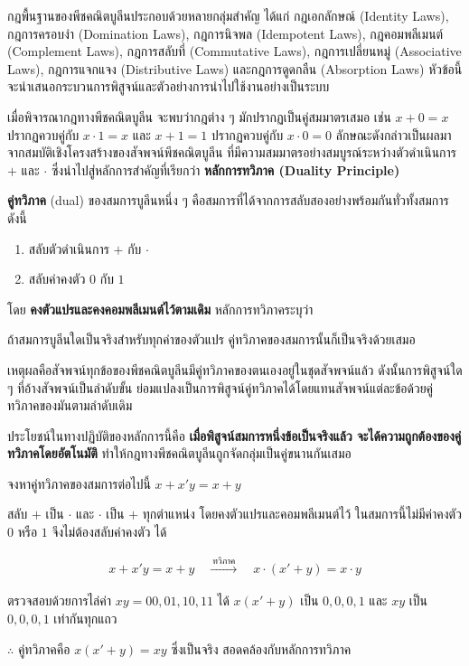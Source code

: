 กฎพื้นฐานของพีชคณิตบูลีนประกอบด้วยหลายกลุ่มสำคัญ ได้แก่ กฎเอกลักษณ์ (Identity Laws), กฎการครอบงำ (Domination Laws), กฎการนิจพล (Idempotent Laws), กฎคอมพลีเมนต์ (Complement Laws), กฎการสลับที่ (Commutative Laws), กฎการเปลี่ยนหมู่ (Associative Laws), กฎการแจกแจง (Distributive Laws) และกฎการดูดกลืน (Absorption Laws) หัวข้อนี้จะนำเสนอกระบวนการพิสูจน์และตัวอย่างการนำไปใช้งานอย่างเป็นระบบ

เมื่อพิจารณากฎทางพีชคณิตบูลีน จะพบว่ากฎต่าง ๆ มักปรากฏเป็นคู่สมมาตรเสมอ เช่น $x + 0 = x$ ปรากฏควบคู่กับ $x \cdot 1 = x$ และ $x + 1 = 1$ ปรากฏควบคู่กับ $x \cdot 0 = 0$ ลักษณะดังกล่าวเป็นผลมาจากสมบัติเชิงโครงสร้างของสัจพจน์พีชคณิตบูลีน ที่มีความสมมาตรอย่างสมบูรณ์ระหว่างตัวดำเนินการ $+$ และ $\cdot$ ซึ่งนำไปสู่หลักการสำคัญที่เรียกว่า \textbf{หลักการทวิภาค (Duality Principle)}

\begin{principle}
\label{prin:duality}
\textbf{คู่ทวิภาค} (dual) ของสมการบูลีนหนึ่ง ๆ คือสมการที่ได้จากการสลับสองอย่างพร้อมกันทั่วทั้งสมการ ดังนี้

\begin{enumerate}
    \item สลับตัวดำเนินการ $+$ กับ $\cdot$
    \item สลับค่าคงตัว $0$ กับ $1$
\end{enumerate}

โดย \textbf{คงตัวแปรและคงคอมพลีเมนต์ไว้ตามเดิม} หลักการทวิภาคระบุว่า

\begin{center}
ถ้าสมการบูลีนใดเป็นจริงสำหรับทุกค่าของตัวแปร คู่ทวิภาคของสมการนั้นก็เป็นจริงด้วยเสมอ
\end{center}

เหตุผลคือสัจพจน์ทุกข้อของพีชคณิตบูลีนมีคู่ทวิภาคของตนเองอยู่ในชุดสัจพจน์แล้ว ดังนั้นการพิสูจน์ใด ๆ ที่อ้างสัจพจน์เป็นลำดับขั้น ย่อมแปลงเป็นการพิสูจน์คู่ทวิภาคได้โดยแทนสัจพจน์แต่ละข้อด้วยคู่ทวิภาคของมันตามลำดับเดิม

ประโยชน์ในทางปฏิบัติของหลักการนี้คือ \textbf{เมื่อพิสูจน์สมการหนึ่งข้อเป็นจริงแล้ว จะได้ความถูกต้องของคู่ทวิภาคโดยอัตโนมัติ} ทำให้กฎทางพีชคณิตบูลีนถูกจัดกลุ่มเป็นคู่ขนานกันเสมอ
\end{principle}

\begin{ex}
\label{ex:duality}
จงหาคู่ทวิภาคของสมการต่อไปนี้ $x + x'y = x + y$
\end{ex}
\begin{solution}
สลับ $+$ เป็น $\cdot$ และ $\cdot$ เป็น $+$ ทุกตำแหน่ง โดยคงตัวแปรและคอมพลีเมนต์ไว้ ในสมการนี้ไม่มีค่าคงตัว $0$ หรือ $1$ จึงไม่ต้องสลับค่าคงตัว ได้

\begin{align*}
x + x'y = x + y \quad \xrightarrow{\ \text{ทวิภาค}\ } \quad x \cdot (x' + y) = x \cdot y
\end{align*}

ตรวจสอบด้วยการไล่ค่า $xy = 00, 01, 10, 11$ ได้ $x(x'+y)$ เป็น $0, 0, 0, 1$ และ $xy$ เป็น $0, 0, 0, 1$ เท่ากันทุกแถว

$\therefore$ คู่ทวิภาคคือ $x(x' + y) = xy$ ซึ่งเป็นจริง สอดคล้องกับหลักการทวิภาค \solhere
\end{solution}

